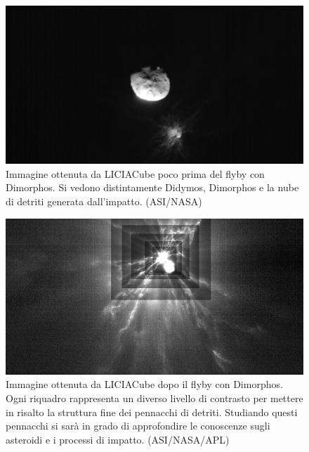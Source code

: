 \begin{figure}
    \centering
    \includegraphics[width=\textwidth]{figure/liciacube_impact_1.png}
    \caption[Immagine ottenuta da LICIACube poco prima del flyby con Dimorphos.]{Immagine ottenuta da LICIACube poco prima del flyby con Dimorphos. Si vedono distintamente Didymos, Dimorphos e la nube di detriti generata dall'impatto. (ASI/NASA)}
    \label{fig:liciacube_impact_1}
\end{figure}

\begin{figure}
    \centering
    \includegraphics[width=\textwidth]{figure/liciacube_impact_tot.jpg}
    \caption[Immagine ottenuta da LICIACube dopo il flyby con Dimorphos.]{Immagine ottenuta da LICIACube dopo il flyby con Dimorphos. Ogni riquadro rappresenta un diverso livello di contrasto per mettere in risalto la struttura fine dei pennacchi di detriti. Studiando questi pennacchi si sarà in grado di approfondire le conoscenze sugli asteroidi e i processi di impatto. (ASI/NASA/APL)}
    \label{fig:liciacube_impact_tot}
\end{figure}

